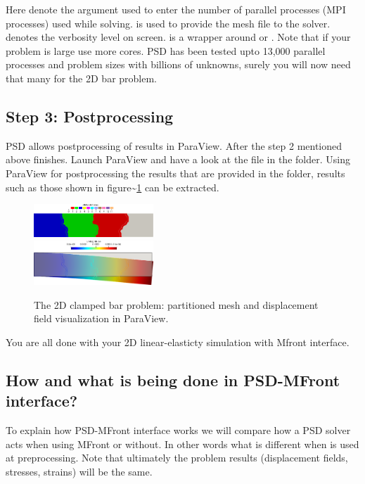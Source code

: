 Here  denote the argument used to enter the number of
parallel processes (MPI processes) used while solving.
 is used to provide the mesh file to
the solver.  denotes the verbosity level on screen.
 is a wrapper around  or
. Note that if your problem is large use more cores.
PSD has been tested upto 13,000 parallel processes and problem sizes
with billions of unknowns, surely you will now need that many for the 2D
bar problem.

\subsection{Step 3: Postprocessing}

PSD allows postprocessing of results in ParaView. After the step 2
mentioned above finishes. Launch ParaView and have a look at the
 file in the  folder. Using ParaView for
postprocessing the results that are provided in the 
folder, results such as those shown in
figure\textasciitilde{}\ref{bar-le-full} can be extracted.

\begin{figure}[h!]
\centering
\includegraphics[width=0.4\textwidth]{./Images/le-2d-bar-partioned.png}\\
\includegraphics[width=0.4\textwidth]{./Images/le-2d-bar-results.png}
\caption{The 2D clamped bar problem: partitioned mesh and displacement field visualization in ParaView. \label{bar-le-full}}
\end{figure}

You are all done with your 2D linear-elasticty simulation with Mfront
interface.

\subsection{How and what is being done in PSD-MFront interface? }

To explain how PSD-MFront interface works we will compare how a PSD
solver acts when using MFront or without. In other words what is
different when  is used at preprocessing. Note that
ultimately the problem results (displacement fields, stresses, strains)
will be the same.

